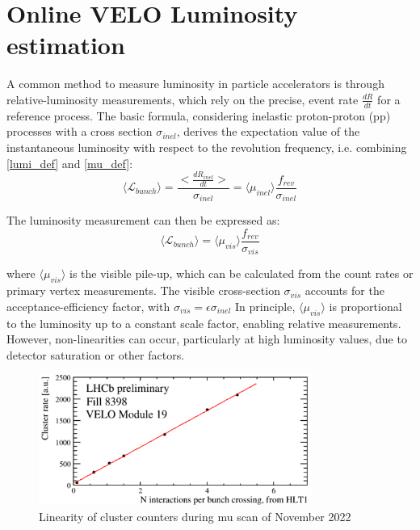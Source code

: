 \section{Online VELO Luminosity estimation}
A common method to measure luminosity in particle accelerators is through relative-luminosity measurements, which rely on the precise, event rate $\frac{dR}{dt}$ for a reference process. The basic formula, considering inelastic proton-proton (pp) processes with a cross section $\sigma_{inel}$, derives the expectation value of the instantaneous luminosity with respect to the revolution frequency, i.e. combining \eqref{lumi_def} and \eqref{mu_def}:
\begin{equation}
    \langle\mathcal{L}_{bunch}\rangle = \dfrac{\bigl<\frac{dR_{inel}}{dt}\bigr>}{\sigma_{inel}} = \langle\mu_{inel}\rangle\frac{f_{rev}}{\sigma_{inel}}
\end{equation}

The luminosity measurement can then be expressed as:
\begin{equation}
    \langle\mathcal{L}_{bunch}\rangle =  \langle\mu_{vis}\rangle\frac{f_{rev}}{\sigma_{vis}}
\end{equation}

where $\langle\mu_{vis}\rangle$ is the visible pile-up, which can be calculated from the count rates or primary vertex measurements. The visible cross-section $\sigma_{vis}$  accounts for the acceptance-efficiency factor, with 
$\sigma_{vis} = \epsilon \sigma_{inel}$
In principle, $\langle\mu_{vis}\rangle$ is proportional to the luminosity up to a constant scale factor, enabling relative measurements. However, non-linearities can occur, particularly at high luminosity values, due to detector saturation or other factors.

\begin{figure}
    \centering
    \includegraphics[width=0.8\textwidth]{figures/muscan.png}
    \caption{Linearity of cluster counters during mu scan of November 2022}
    \label{fig:muscan}
\end{figure}


